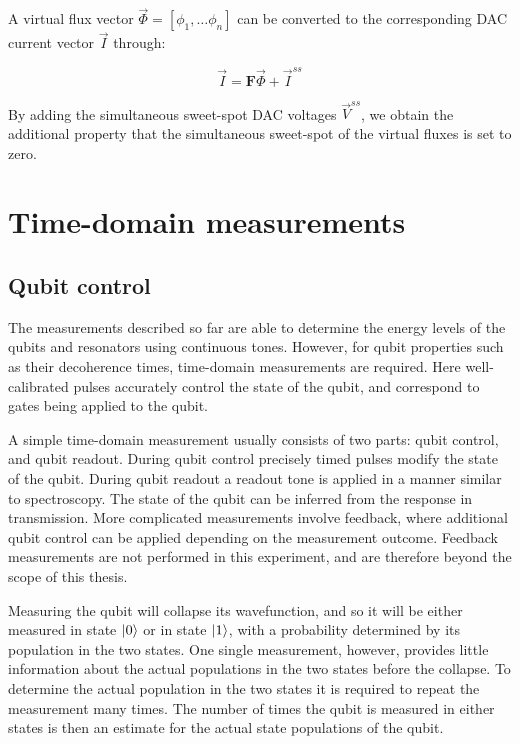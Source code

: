         A virtual flux vector $\vec{\Phi}=\left[ \phi_1, \dots \phi_n \right]$ can be converted to the corresponding DAC current vector $\vec{I}$ through:

        \begin{equation}
          \vec{I} = \boldsymbol{F} \vec{\Phi} + \vec{I}^{ss}
        \end{equation}

        By adding the simultaneous sweet-spot DAC voltages $\vec{V}^{ss}$, we obtain the additional property that the simultaneous sweet-spot of the virtual fluxes is set to zero.

    \section{Time-domain measurements}
      \subsection{Qubit control}
        \label{ssec:qubit control}
        The measurements described so far are able to determine the energy levels of the qubits and resonators using continuous tones. However, for qubit properties such as their decoherence times, time-domain measurements are required. Here well-calibrated pulses accurately control the state of the qubit, and correspond to gates being applied to the qubit.

        A simple time-domain measurement usually consists of two parts: qubit control, and qubit readout. During qubit control precisely timed pulses modify the state of the qubit. During qubit readout a readout tone is applied in a manner similar to spectroscopy. The state of the qubit can be inferred from the response in transmission. More complicated measurements involve feedback, where additional qubit control can be applied depending on the measurement outcome. Feedback measurements are not performed in this experiment, and are therefore beyond the scope of this thesis.

        Measuring the qubit will collapse its wavefunction, and so it will be either measured in state $\ket{0}$ or in state $\ket{1}$, with a probability determined by its population in the two states. One single measurement, however, provides little information about the actual populations in the two states before the collapse. To determine the actual population in the two states it is required to repeat the measurement many times. The number of times the qubit is measured in either states is then an estimate for the actual state populations of the qubit.

